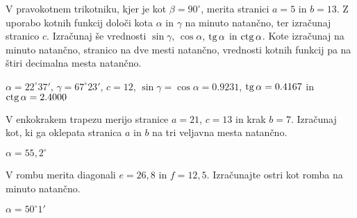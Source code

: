 \begin{vaja}
V pravokotnem trikotniku, kjer je kot $\beta= 90^{\circ}$, merita stranici $a=5$ in $b=13$. Z uporabo kotnih funkcij določi kota $\alpha$ in $\gamma$ na minuto natančno, ter izračunaj stranico $c$. Izračunaj še vrednosti $\sin\gamma$, $\cos\alpha$, $\operatorname{tg}\alpha$ in $\operatorname{ctg}\alpha$. Kote izračunaj na minuto natančno, stranico na dve mesti natančno, vrednosti kotnih funkcij pa na štiri decimalna mesta natančno.
	\begin{odgovor}
$\alpha=22^{\circ}37'$, $\gamma=67^{\circ}23'$, $c=12$, $\sin\gamma=\cos\alpha=0.9231$, $\operatorname{tg}\alpha=0.4167$ in $\operatorname{ctg}\alpha=2.4000$
	\end{odgovor}
\end{vaja}

\begin{vaja}
V enkokrakem trapezu merijo stranice $a=21$, $c=13$ in krak $b=7$. Izračunaj kot, ki ga oklepata stranica $a$ in $b$ na tri veljavna mesta natančno.
	\begin{odgovor}
$\alpha=55,2^{\circ}$
	\end{odgovor}
\end{vaja}

\begin{vaja}
V rombu merita diagonali $e=26,8$ in $f=12,5$. Izračunajte ostri kot romba na minuto natančno.
	\begin{odgovor}
$\alpha=50^{\circ}1'$
	\end{odgovor}
\end{vaja}

